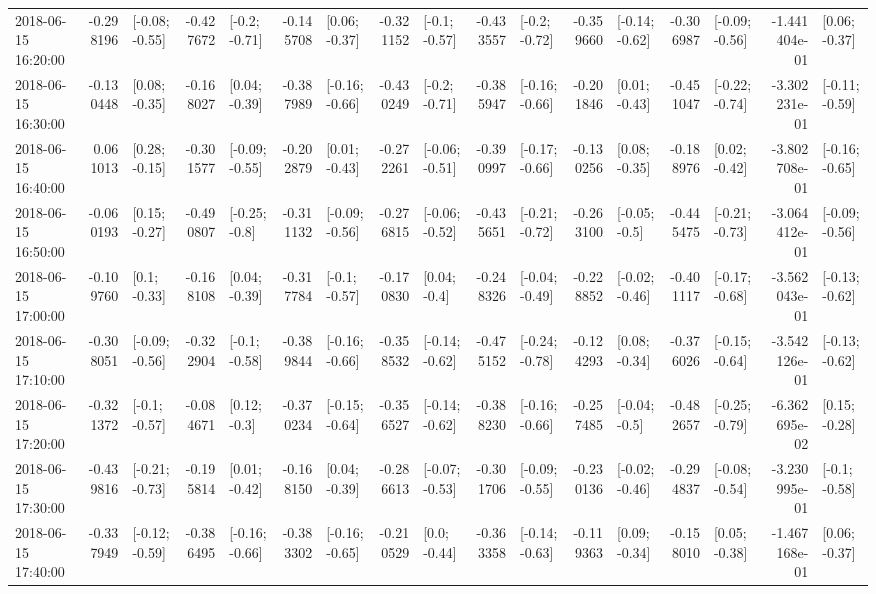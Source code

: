 \begin{tabular}{lrlrlrlrlrlrlrlrl}
2018-06-15 16:20:00 & -0.298196 &  [-0.08; -0.55] & -0.427672 &   [-0.2; -0.71] & -0.145708 &   [0.06; -0.37] & -0.321152 &   [-0.1; -0.57] & -0.433557 &   [-0.2; -0.72] & -0.359660 &  [-0.14; -0.62] & -0.306987 &  [-0.09; -0.56] & -1.441404e-01 &   [0.06; -0.37] \\
2018-06-15 16:30:00 & -0.130448 &   [0.08; -0.35] & -0.168027 &   [0.04; -0.39] & -0.387989 &  [-0.16; -0.66] & -0.430249 &   [-0.2; -0.71] & -0.385947 &  [-0.16; -0.66] & -0.201846 &   [0.01; -0.43] & -0.451047 &  [-0.22; -0.74] & -3.302231e-01 &  [-0.11; -0.59] \\
2018-06-15 16:40:00 &  0.061013 &   [0.28; -0.15] & -0.301577 &  [-0.09; -0.55] & -0.202879 &   [0.01; -0.43] & -0.272261 &  [-0.06; -0.51] & -0.390997 &  [-0.17; -0.66] & -0.130256 &   [0.08; -0.35] & -0.188976 &   [0.02; -0.42] & -3.802708e-01 &  [-0.16; -0.65] \\
2018-06-15 16:50:00 & -0.060193 &   [0.15; -0.27] & -0.490807 &   [-0.25; -0.8] & -0.311132 &  [-0.09; -0.56] & -0.276815 &  [-0.06; -0.52] & -0.435651 &  [-0.21; -0.72] & -0.263100 &   [-0.05; -0.5] & -0.445475 &  [-0.21; -0.73] & -3.064412e-01 &  [-0.09; -0.56] \\
2018-06-15 17:00:00 & -0.109760 &    [0.1; -0.33] & -0.168108 &   [0.04; -0.39] & -0.317784 &   [-0.1; -0.57] & -0.170830 &    [0.04; -0.4] & -0.248326 &  [-0.04; -0.49] & -0.228852 &  [-0.02; -0.46] & -0.401117 &  [-0.17; -0.68] & -3.562043e-01 &  [-0.13; -0.62] \\
2018-06-15 17:10:00 & -0.308051 &  [-0.09; -0.56] & -0.322904 &   [-0.1; -0.58] & -0.389844 &  [-0.16; -0.66] & -0.358532 &  [-0.14; -0.62] & -0.475152 &  [-0.24; -0.78] & -0.124293 &   [0.08; -0.34] & -0.376026 &  [-0.15; -0.64] & -3.542126e-01 &  [-0.13; -0.62] \\
2018-06-15 17:20:00 & -0.321372 &   [-0.1; -0.57] & -0.084671 &    [0.12; -0.3] & -0.370234 &  [-0.15; -0.64] & -0.356527 &  [-0.14; -0.62] & -0.388230 &  [-0.16; -0.66] & -0.257485 &   [-0.04; -0.5] & -0.482657 &  [-0.25; -0.79] & -6.362695e-02 &   [0.15; -0.28] \\
2018-06-15 17:30:00 & -0.439816 &  [-0.21; -0.73] & -0.195814 &   [0.01; -0.42] & -0.168150 &   [0.04; -0.39] & -0.286613 &  [-0.07; -0.53] & -0.301706 &  [-0.09; -0.55] & -0.230136 &  [-0.02; -0.46] & -0.294837 &  [-0.08; -0.54] & -3.230995e-01 &   [-0.1; -0.58] \\
2018-06-15 17:40:00 & -0.337949 &  [-0.12; -0.59] & -0.386495 &  [-0.16; -0.66] & -0.383302 &  [-0.16; -0.65] & -0.210529 &    [0.0; -0.44] & -0.363358 &  [-0.14; -0.63] & -0.119363 &   [0.09; -0.34] & -0.158010 &   [0.05; -0.38] & -1.467168e-01 &   [0.06; -0.37] \\

\end{tabular}
